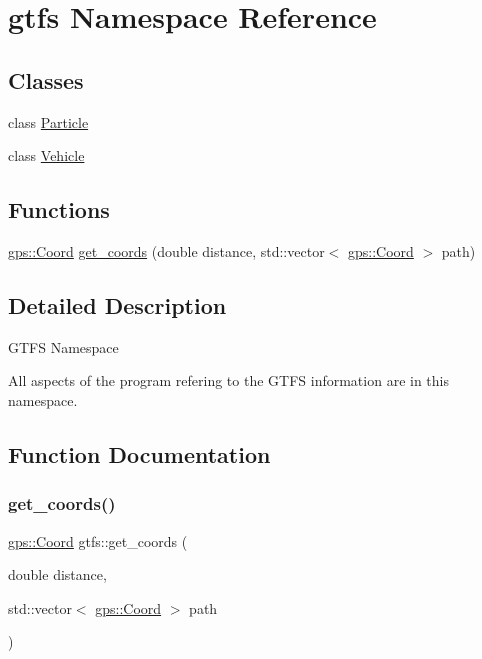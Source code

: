 \hypertarget{namespacegtfs}{}\section{gtfs Namespace Reference}
\label{namespacegtfs}
\subsection*{Classes}
\begin{DoxyCompactItemize}
\item 
class \hyperlink{classgtfs_1_1Particle}{Particle}
\item 
class \hyperlink{classgtfs_1_1Vehicle}{Vehicle}
\end{DoxyCompactItemize}
\subsection*{Functions}
\begin{DoxyCompactItemize}
\item 
\hyperlink{classgps_1_1Coord}{gps\+::\+Coord} \hyperlink{namespacegtfs_aab5513b6c15b5c30de5f706a2e587ae4}{get\+\_\+coords} (double distance, std\+::vector$<$ \hyperlink{classgps_1_1Coord}{gps\+::\+Coord} $>$ path)
\end{DoxyCompactItemize}


\subsection{Detailed Description}
G\+T\+FS Namespace

All aspects of the program refering to the G\+T\+FS information are in this namespace. 

\subsection{Function Documentation}
\mbox{\label{namespacegtfs_aab5513b6c15b5c30de5f706a2e587ae4}} 
\subsubsection{\texorpdfstring{get\+\_\+coords()}{get\_coords()}}
{\footnotesize\ttfamily \hyperlink{classgps_1_1Coord}{gps\+::\+Coord} gtfs\+::get\+\_\+coords (\begin{DoxyParamCaption}\item[{double}]{distance,  }\item[{std\+::vector$<$ \hyperlink{classgps_1_1Coord}{gps\+::\+Coord} $>$}]{path }\end{DoxyParamCaption})}

